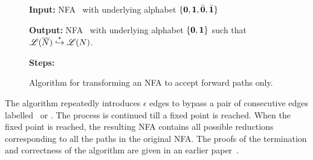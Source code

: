 \documentclass[9pt]{sigplanconf}
\begin{document}
\begin{figure*}[t]
\begin{boxedminipage}{\textwidth}
\begin{center}
  \raggedright  {\bf  Input:}  NFA \ntbar\  with  underlying
  alphabet $\lbrace \mathbf{0}, \mathbf{1}, \bar{\mathbf{0}}, \bar{\mathbf{1}}\rbrace$ \\
%
  \raggedright{\bf Output:} NFA  \nt\ with  underlying
  alphabet $\lbrace \mathbf{0}, \mathbf{1} \rbrace$ such that
  $\mathscr{L}({\overline{N}}) \stackrel{*}{\hookrightarrow} \mathscr{L}({N})$.
  \\
%

  \raggedright{\bf Steps:}





\end{center}
\end{boxedminipage}
 \caption{Algorithm for transforming an NFA to  accept forward
   paths only.}\label{algo:simplify-NFA} \figrule
\end{figure*}

The algorithm repeatedly introduces  $\epsilon$ edges to bypass a pair
of consecutive edges labelled  \bcar\acar\ or \bcdr\acdr.  The process
is continued till  a fixed point is reached.  When  the fixed point is
reached,   the  resulting   NFA  contains   all   possible  reductions
corresponding to all the paths in the original NFA.  The proofs of the
termination and correctness  of the algorithm are given  in an earlier
paper~\cite{karkare07liveness}.
\end{document}
